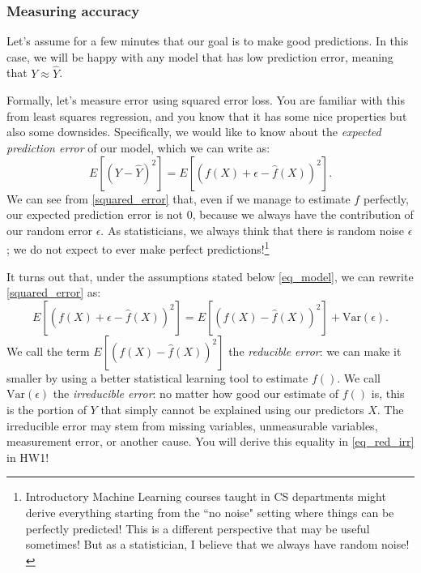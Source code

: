 \documentclass[titlepage,10pt]{scrartcl}
\begin{document}
\subsubsection{Measuring accuracy}

Let's assume for a few minutes that our goal is to make good predictions. In this case, we will be happy with any model that has low prediction error, meaning that $Y \approx \hat{Y}$. 

Formally, let's measure error using squared error loss. You are familiar with this from least squares regression, and you know that it has some nice properties but also some downsides. Specifically, we would like to know about the \emph{expected prediction error} of our model, which we can write as:  
\begin{equation}
\label{squared_error}
E[(Y - \hat{Y})^2] =  	E\left[\left(f(X) + \epsilon - \hat{f}(X)\right)^2\right]. 
\end{equation}
We can see from \eqref{squared_error} that, even if we manage to estimate $f$ perfectly, our expected prediction error is not $0$, because we always have the contribution of our random error $\epsilon$. As statisticians, we always think that there is random noise $\epsilon$; we do not expect to ever make perfect predictions!\footnote{Introductory Machine Learning courses taught in CS departments might derive everything starting from the ``no noise" setting where things can be perfectly predicted! This is a different perspective that may be useful sometimes! But as a statistician, I believe that we always have random noise!}

It turns out that, under the assumptions stated below \eqref{eq_model}, we can rewrite \eqref{squared_error} as:
\begin{equation}
\label{eq_red_irr}
E\left[\left(f(X) + \epsilon - \hat{f}(X)\right)^2\right] = E\left[\left(f(X) - \hat{f}(X)\right)^2\right] + \mathrm{Var}\left(\epsilon\right).
\end{equation}
We call the term $E\left[\left(f(X) - \hat{f}(X)\right)^2\right]$ the \emph{reducible error}: we can make it smaller by using a better statistical learning tool to estimate $f()$. 
We call $\mathrm{Var}\left(\epsilon\right)$ the \emph{irreducible error}: no matter how good our estimate of $f()$ is, this is the portion of $Y$ that simply cannot be explained using our predictors $X$. The irreducible error may stem from missing variables, unmeasurable variables, measurement error, or another cause.  You will derive this equality in \eqref{eq_red_irr} in HW1! 
\end{document}
